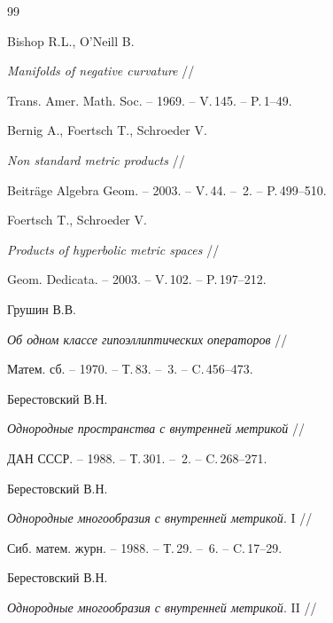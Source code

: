 \begin{thebibliography}{99}


Bishop R.L., O'Neill B.


 {\em Manifolds of negative curvature} //


 Trans. Amer. Math. Soc. -- 1969. -- V.\,145. -- P.\,1--49.







Bernig A., Foertsch T., Schroeder V.


 {\em Non standard metric products} //


 Beitr\"{a}ge Algebra Geom. -- 2003. -- V.\,44. -- \No\,2. -- P.\,499--510.







Foertsch T., Schroeder V.


 {\em Products of hyperbolic metric spaces} //


 Geom. Dedicata. -- 2003. -- V.\,102. -- P.\,197--212.







Грушин В.В.


 {\em Об одном классе гипоэллиптических операторов} //


 Матем. сб. -- 1970. -- Т.\,83. -- \No\,3. -- C.\,456--473.







Берестовский В.Н.


 {\em Однородные пространства с внутренней метрикой} //


 ДАН СССР. -- 1988. -- Т.\,301. -- \No\,2. -- C.\,268--271.







Берестовский В.Н.


 {\em Однородные многообразия с внутренней метрикой}. I //


 Сиб. матем. журн. -- 1988. -- Т.\,29. -- \No\,6. -- C.\,17--29.







Берестовский В.Н.


 {\em Однородные многообразия с внутренней метрикой}. II //



\end{thebibliography}
